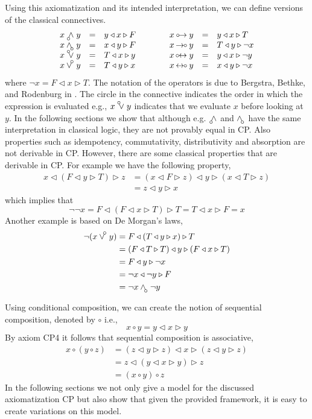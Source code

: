 \documentclass[a4paper,twoside,openright]{report}
\newcommand{\lef}{\ensuremath{\triangleleft}}
\newcommand{\rig}{\ensuremath{\triangleright}}
\newcommand{\leftand}{~
     \mathbin{\setlength{\unitlength}{1ex}
     \begin{picture}(1.4,1.8)(-.3,0)
     \put(-.6,0){$\wedge$}
     \put(-.53,-0.36){\circle{0.6}}
     \end{picture}
     }}
\newcommand{\rightand}{~
     \mathbin{\setlength{\unitlength}{1ex}
     \begin{picture}(1.4,1.8)(0,0)
     \put(-.8,0){$\wedge$}
     \put(.72,-0.36){\circle{0.6}}
     \end{picture}
     }}
\newcommand{\leftor}{~
     \mathbin{\setlength{\unitlength}{1ex}
     \begin{picture}(1.4,1.8)(-.3,0)
     \put(-.6,0){$\vee$}
     \put(-.53,1.7){\circle{0.6}}
     \end{picture}
     }}
\newcommand{\rightor}{~
     \mathbin{\setlength{\unitlength}{1ex}
     \begin{picture}(1.4,1.8)
     \put(-.8,0){$\vee$}
     \put(.72,1.7){\circle{0.6}}
     \end{picture}
     }}
\newcommand{\leftimp}{~
     \mathbin{\setlength{\unitlength}{1ex}
     \begin{picture}(1.5,1.8)
     \put(-.1,0){$\rightarrow$}
     \put(-.3,0.57){\circle{0.6}}
     \end{picture}
     ~}}
\newcommand{\rightimp}{~
     \mathbin{\setlength{\unitlength}{1ex}
     \begin{picture}(1.5,1.8)
     \put(-.9,0){$\rightarrow$}
     \put(1.76,0.57){\circle{0.6}}
     \end{picture}
     ~}}
\newcommand{\leftbiimp}{~
     \mathbin{\setlength{\unitlength}{1ex}
     \begin{picture}(1.5,1.8)
     \put(-.1,0){$\leftrightarrow$}
     \put(-.44,0.57){\circle{0.6}}
     \end{picture}
     ~}}
\newcommand{\rightbiimp}{~
     \mathbin{\setlength{\unitlength}{1ex}
     \begin{picture}(1.5,1.8)
     \put(-.9,0){$\leftrightarrow$}
     \put(1.76,0.57){\circle{0.6}}
     \end{picture}
     ~}}
\begin{document}
Using this axiomatization and its intended interpretation, we can define versions of the classical connectives.
\[
\begin{array}{rclcrcl}
x\leftand y & = & y\lef x\rig F &\qquad& x\leftimp y & = & y\lef x\rig T\\
x\rightand y & = & x\lef y\rig F &\qquad& x\rightimp y & = & T\lef y\rig\neg x\\
x\leftor y & = & T\lef x\rig y &\qquad& x\leftbiimp y & = & y\lef x\rig\neg y\\
x\rightor y & = & T\lef y\rig x &\qquad& x\rightbiimp y & = & x\lef y\rig\neg x
\end{array}
\]
where $\neg x=F\lef x\rig T$. The notation of the operators is due to Bergstra, Bethke, and Rodenburg in \cite{connectives}. The circle in the connective indicates the order in which the expression is evaluated e.g., $x\leftor y$ indicates that we evaluate $x$ before looking at $y$. In the following sections we show that although e.g. $\leftand$ and $\rightand$ have the same interpretation in classical logic, they are not provably equal in CP. Also properties such as idempotency, commutativity, distributivity and absorption are not derivable in CP. However, there are some classical properties that are derivable in CP. For example we have the following property,
\begin{align*}
x\lef(F\lef y\rig T)\rig z
&=(x\lef F\rig z)\lef y\rig(x\lef T\rig z)\\
&=z\lef y\rig x
\end{align*}
which implies that 
\[
\neg\neg x = F\lef (F\lef x\rig T)\rig T = T\lef x\rig F = x
\]
Another example is based on De Morgan's laws,
\begin{align*}
\neg(x\rightor y)
&= F\lef(T\lef y\rig x)\rig T\\
&= (F\lef T\rig T)\lef y\rig(F\lef x\rig T)\\
&= F\lef y\rig\neg x\\
&= \neg x\lef \neg y\rig F\\
&= \neg x\rightand\neg y
\end{align*}

Using conditional composition, we can create the notion of sequential composition, denoted by $\circ$ i.e.,
\[
x\circ y = y\lef x\rig y
\]
By axiom CP4 it follows that sequential composition is associative,
\begin{align*}
x\circ(y\circ z) 
&= (z\lef y\rig z)\lef x\rig(z\lef y\rig z)\\
&= z\lef(y\lef x\rig y)\rig z\\
&= (x\circ y)\circ z
\end{align*}
In the following sections we not only give a model for the discussed axiomatization CP but also show that given the provided framework, it is easy to create variations on this model.
\end{document}
